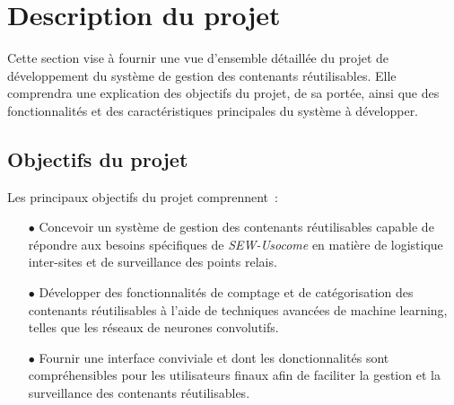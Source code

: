 \section{Description du projet}

Cette section vise à fournir une vue d'ensemble détaillée du projet de
développement du système de gestion des contenants réutilisables. Elle
comprendra une explication des objectifs du projet, de sa portée,
ainsi que des fonctionnalités et des caractéristiques principales du
système à développer.

\subsection{Objectifs du projet}

Les principaux objectifs du projet comprennent~:\\

\begin{itemize}
\item[$\bullet$] Concevoir un système de gestion des contenants
  réutilisables capable de répondre aux besoins spécifiques de
  \emph{SEW-Usocome} en matière de logistique inter-sites et de
  surveillance des points relais.
\item[$\bullet$] Développer des fonctionnalités de comptage et de
  catégorisation des contenants réutilisables à l'aide de techniques
  avancées de machine learning, telles que les réseaux de neurones
  convolutifs.
\item[$\bullet$] Fournir une interface conviviale et dont les
  donctionnalités sont compréhensibles pour les utilisateurs finaux
  afin de faciliter la gestion et la surveillance des contenants
  réutilisables.
\end{itemize}



